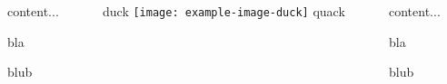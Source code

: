 \documentclass{beamer}
\begin{document}
\begin{frame}
\begin{columns}[c]
    \begin{column}{.2\textwidth}
        \raggedleft
        content...

        \vspace{1.5cm}

        bla

        \vspace{1cm}

        blub
    \end{column}
    \begin{column}{.55\textwidth}
        \centering
        duck
        \texttt{[image: example-image-duck]}
        quack
    \end{column}
    \begin{column}{.2\textwidth}
        content...

        \vspace{1.5cm}

        bla

        \vspace{1cm}

        blub
    \end{column}        
\end{columns}
\end{frame}
\end{document}

